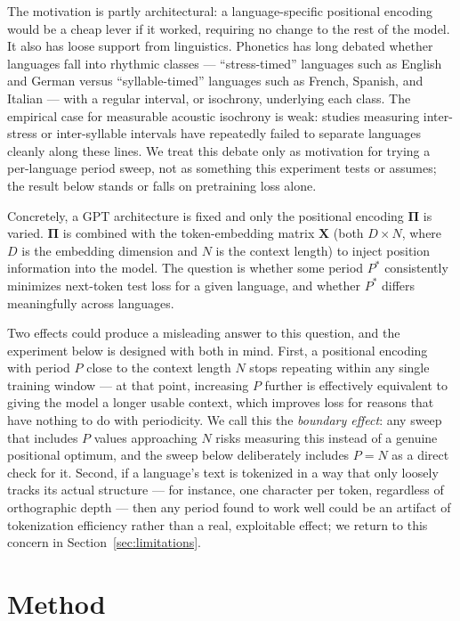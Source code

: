 \documentclass[11pt]{article}
\begin{document}
The motivation is partly architectural: a language-specific positional encoding would be a cheap lever if it worked, requiring no change to the rest of the model. It also has loose support from linguistics. Phonetics has long debated whether languages fall into rhythmic classes --- ``stress-timed'' languages such as English and German versus ``syllable-timed'' languages such as French, Spanish, and Italian --- with a regular interval, or isochrony, underlying each class. The empirical case for measurable acoustic isochrony is weak: studies measuring inter-stress or inter-syllable intervals have repeatedly failed to separate languages cleanly along these lines. We treat this debate only as motivation for trying a per-language period sweep, not as something this experiment tests or assumes; the result below stands or falls on pretraining loss alone.

Concretely, a GPT architecture is fixed and only the positional encoding $\mathbf{\Pi}$ is varied. $\mathbf{\Pi}$ is combined with the token-embedding matrix $\mathbf{X}$ (both $D \times N$, where $D$ is the embedding dimension and $N$ is the context length) to inject position information into the model. The question is whether some period $P^{*}$ consistently minimizes next-token test loss for a given language, and whether $P^{*}$ differs meaningfully across languages.

Two effects could produce a misleading answer to this question, and the experiment below is designed with both in mind. First, a positional encoding with period $P$ close to the context length $N$ stops repeating within any single training window --- at that point, increasing $P$ further is effectively equivalent to giving the model a longer usable context, which improves loss for reasons that have nothing to do with periodicity. We call this the \emph{boundary effect}: any sweep that includes $P$ values approaching $N$ risks measuring this instead of a genuine positional optimum, and the sweep below deliberately includes $P = N$ as a direct check for it. Second, if a language's text is tokenized in a way that only loosely tracks its actual structure --- for instance, one character per token, regardless of orthographic depth --- then any period found to work well could be an artifact of tokenization efficiency rather than a real, exploitable effect; we return to this concern in Section~\ref{sec:limitations}.

\section{Method}
\end{document}
